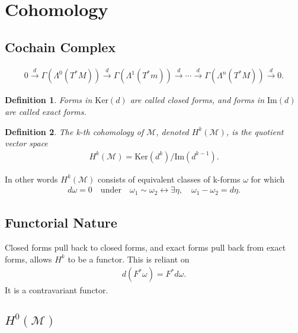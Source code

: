 \documentclass[10pt]{amsart}
\newtheorem{definition}{Definition}[section]
\newcommand{\im}{\text{Im}}
\renewcommand{\ker}{\text{Ker}}
\newcommand{\M}{\mathcal{M}}
\renewcommand{\*}{\star}
\begin{document}
\section{Cohomology}%
\label{sec:cohomology}

\subsection{Cochain Complex}%
\label{sub:cochain_complex}

\begin{align*}
  0\xrightarrow{d}\Gamma(\Lambda^0(T^*M))\xrightarrow{d}\Gamma(\Lambda^1(T^*m))\xrightarrow{d}\cdots
  \xrightarrow{d}\Gamma(\Lambda^n(T^*M))\xrightarrow{d}0.
\end{align*}

\begin{definition}
  Forms in $\ker(d)$ are called closed forms, and forms in $\im(d)$ are called
  exact forms.
\end{definition}

\begin{definition}
  The k-th cohomology of $\M$, denoted $H^k(\M)$, is the quotient vector space
  \begin{align*}
    H^k(\M)=\ker(d^k)/\im(d^{k-1}).
  \end{align*}
\end{definition}

In other words $H^k(\M)$ consists of equivalent classes of k-forms $\omega$ for
which
\begin{align*}
  d\omega
  =0\quad\text{under}\quad\omega_1\sim\omega_2\leftrightarrow\exists\eta,\quad
  \omega_1-\omega_2=d\eta.
\end{align*}

\subsection{Functorial Nature}%
\label{sub:functorial_nature}

Closed forms pull back to closed forms, and exact forms pull back from exact
forms, allows $H^k$ to be a functor. This is reliant on
\begin{align*}
  d(F^*\omega)=F^*d\omega.
\end{align*}
It is a contravariant functor.

\subsection{$H^0(\M)$}%
\label{sub:_h_0_m_}
\end{document}
